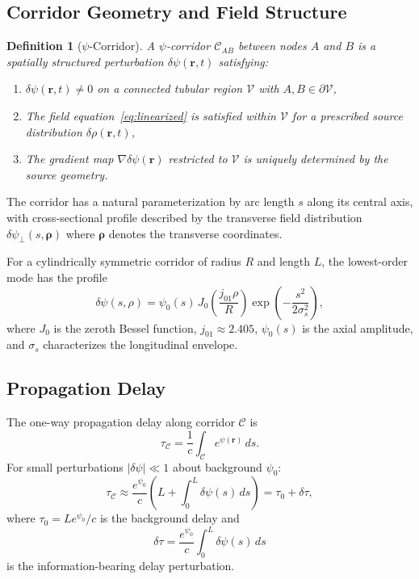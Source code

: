 \documentclass[twocolumn,superscriptaddress,prd,nofootinbib]{revtex4-2}
\newcommand{\Corridor}{\mathcal{C}}
\newtheorem{definition}{Definition}
\begin{document}
\subsection{Corridor Geometry and Field Structure}

\begin{definition}[$\psi$-Corridor]
A $\psi$-corridor $\Corridor_{AB}$ between nodes $A$ and $B$ is a
spatially structured perturbation $\delta\psi(\mathbf{r},t)$ satisfying:
\begin{enumerate}[label=(\alph*)]
\item $\delta\psi(\mathbf{r},t) \neq 0$ on a connected tubular region
$\mathcal{V}$ with $A,B \in \partial\mathcal{V}$,
\item The field equation~\eqref{eq:linearized} is satisfied within
$\mathcal{V}$ for a prescribed source distribution $\delta\rho(\mathbf{r},t)$,
\item The gradient map $\nabla\delta\psi(\mathbf{r})$ restricted to
$\mathcal{V}$ is uniquely determined by the source geometry.
\end{enumerate}
\end{definition}

The corridor has a natural parameterization by arc length $s$ along its
central axis, with cross-sectional profile described by the transverse
field distribution $\delta\psi_\perp(s, \boldsymbol{\rho})$ where
$\boldsymbol{\rho}$ denotes the transverse coordinates.

For a cylindrically symmetric corridor of radius $R$ and length $L$,
the lowest-order mode has the profile
\begin{equation}
\delta\psi(s, \rho) = \psi_0(s)\,J_0\!\left(\frac{j_{01}\rho}{R}\right)
\exp\!\left(-\frac{s^2}{2\sigma_s^2}\right),
\label{eq:corridor-profile}
\end{equation}
where $J_0$ is the zeroth Bessel function, $j_{01} \approx 2.405$,
$\psi_0(s)$ is the axial amplitude, and $\sigma_s$ characterizes the
longitudinal envelope.

\subsection{Propagation Delay}

The one-way propagation delay along corridor $\Corridor$ is
\begin{equation}
\tau_\Corridor = \frac{1}{c}\int_\Corridor e^{\psi(\mathbf{r})}\,ds.
\label{eq:delay}
\end{equation}
For small perturbations $|\delta\psi| \ll 1$ about background $\psi_0$:
\begin{equation}
\tau_\Corridor \approx \frac{e^{\psi_0}}{c}\left(L + \int_0^L
\delta\psi(s)\,ds\right)
= \tau_0 + \delta\tau,
\label{eq:delay-linearized}
\end{equation}
where $\tau_0 = Le^{\psi_0}/c$ is the background delay and
\begin{equation}
\delta\tau = \frac{e^{\psi_0}}{c}\int_0^L \delta\psi(s)\,ds
\label{eq:delay-perturbation}
\end{equation}
is the information-bearing delay perturbation.
\end{document}
